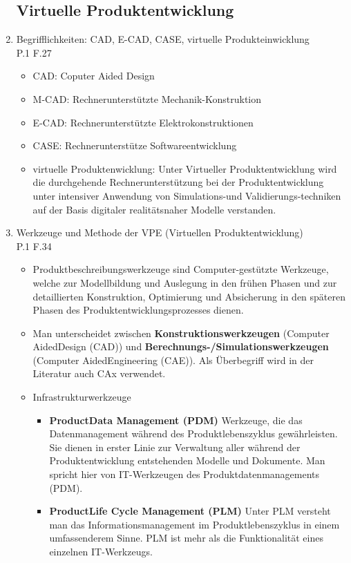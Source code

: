 \documentclass[10pt,a4paper,fleqn]{article}
\begin{document}
\begin{enumerate}
\subsection{Virtuelle Produktentwicklung}
\item Begrifflichkeiten: CAD, E-CAD, CASE, virtuelle Produkteinwicklung\\
	P.1 F.27\\
		\begin{itemize}
			\item CAD: Coputer Aided Design
			\item M-CAD: Rechnerunterstützte Mechanik-Konstruktion
			\item E-CAD: Rechnerunterstützte Elektrokonstruktionen
			\item CASE: Rechnerunterstütze Softwareentwicklung
			\item virtuelle Produktenwicklung: Unter Virtueller Produktentwicklung wird die durchgehende Rechnerunterstützung bei
der Produktentwicklung unter intensiver Anwendung von Simulations-und Validierungs-techniken auf der Basis digitaler realitätsnaher Modelle verstanden.
		\end{itemize}
\item Werkzeuge und Methode der VPE (Virtuellen Produktentwicklung)\\
	P.1 F.34
	\begin{itemize}
		\item Produktbeschreibungswerkzeuge sind Computer-gestützte Werkzeuge, welche zur Modellbildung und Auslegung in den frühen Phasen und zur detaillierten Konstruktion, Optimierung und Absicherung in den späteren Phasen des Produktentwicklungsprozesses dienen.
		\item Man unterscheidet zwischen \textbf{Konstruktionswerkzeugen} (Computer AidedDesign (CAD)) und \textbf{Berechnungs-/Simulationswerkzeugen} (Computer AidedEngineering (CAE)). Als Überbegriff wird in der Literatur auch CAx verwendet.
		\item Infrastrukturwerkzeuge
			\begin{itemize}
				\item \textbf{ProductData Management (PDM)} Werkzeuge, die das Datenmanagement während des Produktlebenszyklus gewährleisten. Sie dienen in erster Linie zur Verwaltung aller während der Produktentwicklung entstehenden Modelle und Dokumente. Man spricht hier von IT-Werkzeugen des Produktdatenmanagements (PDM).
				\item \textbf{ProductLife Cycle Management (PLM)} Unter PLM versteht man das Informationsmanagement im Produktlebenszyklus in einem umfassenderem Sinne. PLM ist mehr als die Funktionalität eines einzelnen IT-Werkzeugs.

\end{itemize}
\end{itemize}
\end{enumerate}
\end{document}
